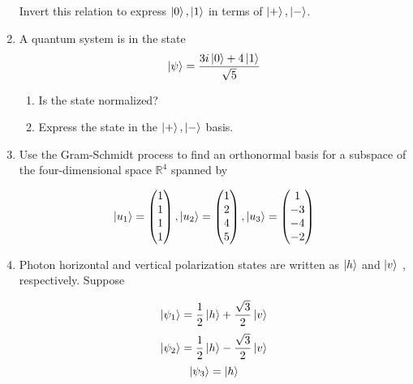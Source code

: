 \documentclass{article}
\begin{document}
\begin{enumerate}
Invert this relation to express ${\ket{0} , \ket{1} }$ in terms of ${\ket{+} , \ket{-} }$.

\item A quantum system is in the state
\[ \ket{\psi}=\frac{3i\ket{0}+4\ket{1}}{\sqrt{5}} \] 

\begin{enumerate}
\item Is the state normalized?
\item Express the state in the $\ket{+}, \ket{-}$ basis.
\end{enumerate}




\item Use the Gram-Schmidt process to find an orthonormal basis for a subspace of
the four-dimensional space $\mathbb{R}^{4}$ spanned by

\[ \ket{u_{1}}=
\begin{pmatrix}
1\\
1\\
1\\
1\\
\end{pmatrix},  
\ket{u_{2}}=
\begin{pmatrix}
1\\
2\\
4\\
5\\
\end{pmatrix},
\ket{u_{3}}=
\begin{pmatrix}
1\\
-3\\
-4\\
-2\\
\end{pmatrix}
 \]

\item Photon horizontal and vertical polarization states are written as $\ket{h}$ and $\ket{v}$ ,
respectively. Suppose

\[ \ket{\psi_{1}}=\frac{1}{2}\ket{h}+\frac{\sqrt{3}}{2}\ket{v} \] 
\[ \ket{\psi_{2}}=\frac{1}{2}\ket{h}-\frac{\sqrt{3}}{2}\ket{v} \] 
\[ \ket{\psi_{3}}=\ket{h} \] 
\end{enumerate}









\end{document}
